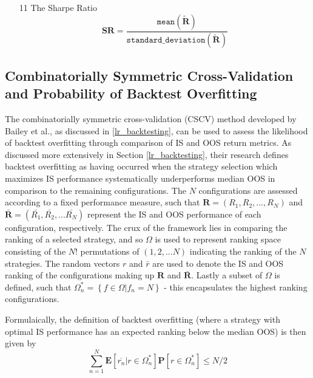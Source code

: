 \documentclass[a4paper,11pt,oneside]{article}
\theoremstyle{plain}
\theoremstyle{definition}
\begin{document}
\begin{itemize}
			\item [11] The Sharpe Ratio
				\begin{equation}
					\mathbf{SR} = \frac{\mathtt{mean}(\mathbf{\tilde{R}})}{\mathtt{standard\_deviation}(\mathbf{\tilde{R}})} 
				\end{equation}
		
	\end{itemize}
	\hfill\break

	\subsection{Combinatorially Symmetric Cross-Validation and Probability of Backtest Overfitting}\label{imp_cscv}
	
	The  combinatorially symmetric cross-validation (CSCV) method developed by Bailey et al., as discussed in \ref{lr_backtesting}, can be used to assess the likelihood of backtest overfitting through comparison of IS and OOS return metrics. As discussed more extensively in Section \ref{lr_backtesting}, their research defines backtest overfitting as having occurred when the strategy selection which maximizes IS performance systematically underperforms median OOS in comparison to the remaining configurations. The $N$  configurations are assessed according to a fixed performance measure, such that $\mathbf{R} = (R_1, R_2, ..., R_N)$ and $\mathbf{\bar{R}} = (\bar{R_1}, \bar{R_2},... \bar{R_N})$ represent the IS and OOS performance of each configuration, respectively. The crux of the framework lies in comparing the ranking of a selected strategy, and so $\Omega$ is used to represent ranking space consisting of the $N!$ permutations of $(1,2,...N)$ indicating the ranking of the $N$ strategies. The random vectors $r$ and $\bar{r}$ are used to denote the IS and OOS ranking of the configurations making up $\mathbf{R}$ and $\mathbf{\bar{R}}$. Lastly a subset of $\Omega$ is defined, such that $\Omega_{n}^{*}=\left\{f \in \Omega | f_{n}=N\right\}$ - this encapsulates the highest ranking configurations. \newline
	
	
	Formulaically, the definition of backtest overfitting (where a strategy with optimal IS performance has an expected ranking below the median OOS) is then given by
	\begin{equation}\label{eq:PBO1}
	\sum_{n=1}^{N}\mathbf{E}[\overline{r_n}|r\in 
	\Omega_{n}^{*}]\mathbf{P}[r\in\Omega_{n}^{*}]\leq{N/2}
	\end{equation}
	
\end{document}

